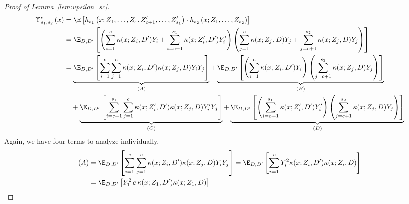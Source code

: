 \begin{proof}[Proof of Lemma~\ref{lem:upsilon_sc}]
	\begin{equation}
		\begin{aligned}
			\Upsilon_{s_1, s_2}^{c}\left(x\right)
			 & = \E\left[h_{s_1}\left(x; Z_1, \ldots, Z_c, Z^{\prime}_{c+1}, \ldots,  Z^{\prime}_{s_1}\right) \cdot
			h_{s_2}\left(x; Z_1, \ldots, Z_{s_2}\right)\right]                                                                                                                       \\
			 & = \E_{D, D^{\prime}}\left[
				\left(\sum_{i = 1}^{c} \kappa(x; Z_{i}, D^{\prime})Y_{i} + \sum_{i = c+1}^{s_1} \kappa(x; Z_{i}^{\prime}, D^{\prime})Y_{i}^{\prime}\right)
				\left(\sum_{j = 1}^{c} \kappa(x; Z_j, D)Y_j + \sum_{j = c+1}^{s_2}\kappa(x; Z_j, D)Y_j \right)
			\right]                                                                                                                                                                                             \\
			 & = \underbrace{\E_{D, D^{\prime}}\left[\sum_{i = 1}^{c}\sum_{j = 1}^{c} \kappa(x; Z_{i}, D^{\prime})\kappa(x; Z_j, D)Y_{i} Y_j\right]}_{(A)}
			+ \underbrace{\E_{D, D^{\prime}}\left[\left(\sum_{i = 1}^{c}\kappa(x; Z_{i}, D^{\prime}) Y_{i}\right) \left(\sum_{j = c+1}^{s_2} \kappa(x; Z_j, D) Y_j\right)\right]}_{(B)} \\
			 & \quad + \underbrace{\E_{D, D^{\prime}}\left[\sum_{i = c+1}^{s_1}\sum_{j = 1}^{c} \kappa(x; Z_{i}^{\prime}, D^{\prime})\kappa(x; Z_j, D)Y_{i}^{\prime} Y_j\right]}_{(C)}
			+ \underbrace{\E_{D, D^{\prime}}\left[\left(\sum_{i = c+1}^{s_1}\kappa(x; Z_{i}^{\prime}, D^{\prime}) Y_{i}^{\prime}\right)
					\left(\sum_{j = c+1}^{s_2} \kappa(x; Z_j, D) Y_j\right)\right]}_{(D)}
		\end{aligned}
	\end{equation}
	Again, we have four terms to analyze individually.
	\begin{equation}
		\begin{aligned}
			(A)
			 & = \E_{D, D^{\prime}}\left[\sum_{i = 1}^{c}\sum_{j = 1}^{c} \kappa(x; Z_{i}, D^{\prime})\kappa(x; Z_j, D)Y_{i} Y_j\right]
			= \E_{D, D^{\prime}}\left[\sum_{i = 1}^{c} Y_{i}^2 \kappa(x; Z_{i}, D^{\prime})\kappa(x; Z_{i}, D)\right]                                                                          \\
			 & = \E_{D, D^{\prime}}\left[Y_{1}^2 \, c \, \kappa(x; Z_1, D^{\prime})\kappa(x; Z_1, D)\right]

\end{aligned}
\end{equation}
\end{proof}
